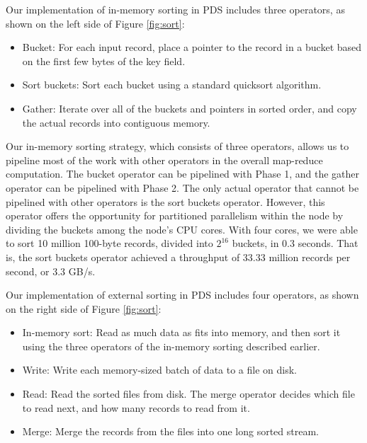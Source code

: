 \documentclass{acm_proc_article-sp}
\begin{document}
Our implementation of in-memory sorting in PDS includes three operators, as
shown on the left side of Figure \ref{fig:sort}:
\begin{itemize}
  \item Bucket: For each input record, place a pointer to the record in a bucket based on the first few bytes of the key field.
  \item Sort buckets: Sort each bucket using a standard quicksort algorithm.
  \item Gather: Iterate over all of the buckets and pointers in sorted order,
  and copy the actual records into contiguous memory.
\end{itemize}

Our in-memory sorting strategy, which consists of three operators, allows us to
pipeline most of the work with other operators in the overall map-reduce
computation. The bucket operator can be pipelined with Phase 1, and the gather
operator can be pipelined with Phase 2. The only actual operator that cannot be
pipelined with other operators is the sort buckets operator. However, this
operator offers the opportunity for partitioned parallelism within the node by
dividing the buckets among the node's CPU cores. With four cores, we were
able to sort 10 million 100-byte records, divided into $2^{16}$ buckets, in 0.3
seconds. That is, the sort buckets operator achieved a throughput of 33.33
million records per second, or 3.3 GB/s.

Our implementation of external sorting in PDS includes four operators, as
shown on the right side of Figure \ref{fig:sort}:
\begin{itemize}
  \item In-memory sort: Read as much data as fits into memory, and then
  sort it using the three operators of the in-memory sorting described earlier.
  \item Write: Write each memory-sized batch of data to a file on disk.
  \item Read: Read the sorted files from disk. The merge operator decides which
  file to read next, and how many records to read from it.
  \item Merge: Merge the records from the files into one long sorted stream.
\end{itemize}
\end{document}
